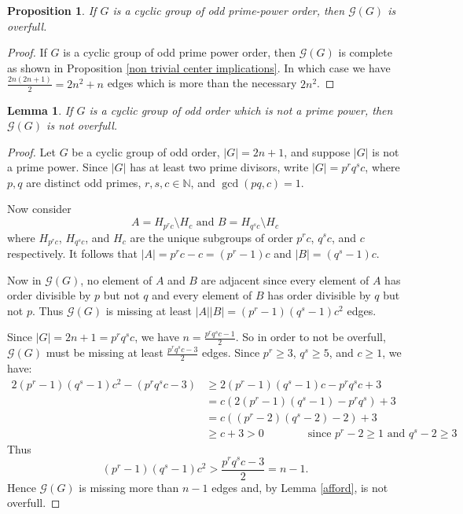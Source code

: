 \documentclass{article}
\newtheorem{lemma}[theorem]{Lemma}
\newtheorem{proposition}[theorem]{Proposition}
\theoremstyle{definition}
\theoremstyle{indentclaim}
\theoremstyle{named}
\theoremstyle{named}
\begin{document}
\bigskip


\begin{proposition}\label{odd cyclic is overfull}
     If $G$ is a cyclic group of odd prime-power order, then $\mathscr{G}(G)$ is overfull. 
\end{proposition}

\begin{proof}
    If $G$ is a cyclic group of odd prime power order, then $\mathscr{G}(G)$ is complete as shown in Proposition \ref{non trivial center implications}. In which case we have $\frac{2n(2n+1)}{2} = 2n^2+n$ edges which is more than the necessary $2n^2$.
\end{proof}



\begin{lemma}\label{lemma: cyclic not prime not ovf}
    If $G$ is a cyclic group of odd order which is not a prime power, then $\mathscr{G}(G)$ is not overfull. 
\end{lemma}

\begin{proof}
    Let $G$ be a cyclic group of odd order, $|G| = 2n+1$, and suppose $|G|$ is not a prime power. Since $|G|$ has at least two prime divisors, write $|G| = p^rq^sc$, where $p, q$ are distinct odd primes, $r, s, c \in \mathbb{N}$, and $\gcd(pq, c)=1$. 

    Now consider 
    \[A = H_{p^rc} \setminus H_c \text{ and } B = H_{q^sc} \setminus H_c\]
    where $H_{p^rc}$, $H_{q^sc}$, and $H_c$ are the unique subgroups of order $p^rc$, $q^sc$, and $c$ respectively. 
    It follows that $|A| = p^rc-c = (p^r - 1)c$ and $|B| = (q^s-1)c$. 

    Now in $\mathscr{G}(G)$, no element of $A$ and $B$ are adjacent since every element of $A$ has order divisible by $p$ but not $q$ and every element of $B$ has order divisible by $q$ but not $p$. Thus $\mathscr{G}(G)$ is missing at least $|A||B| = (p^r-1)(q^s-1)c^2$ edges. 

    Since $|G| = 2n+1 = p^rq^sc$, we have $n =  \frac{p^rq^sc-1}{2}$. So in order to not be overfull, $\mathscr{G}(G)$ must be missing at least $\frac{p^rq^sc-3}{2}$ edges. Since $p^r \geq 3$, $q^s \geq 5$, and $c\geq 1$, we have:
    \begin{align*}
        2(p^r-1)(q^s-1)c^2 - (p^rq^sc-3) &\geq 2(p^r-1)(q^s-1)c-p^rq^sc+3 \\
        & = c(2(p^r-1)(q^s-1)-p^rq^s)+3 \\
        & = c((p^r-2)(q^s-2)-2)+3 \\
        & \geq c+3 >0 \qquad \qquad \text{since } p^r-2 \geq 1 \text{ and } q^s-2 \geq 3
    \end{align*}
    Thus \[(p^r-1)(q^s-1)c^2 > \frac{p^rq^sc-3}{2} = n-1.\] 
    Hence $\mathscr{G}(G)$ is missing more than $n-1$ edges and, by Lemma \ref{afford}, is not overfull. 
\end{proof}
\end{document}
